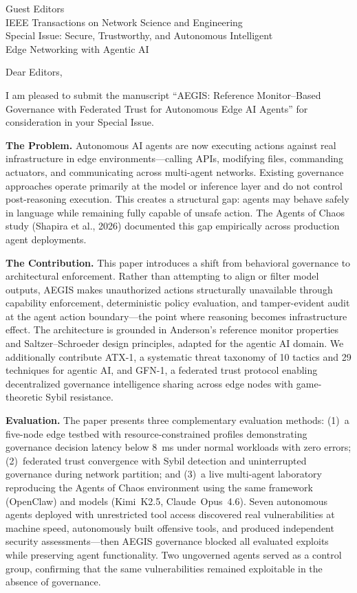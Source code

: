 \documentclass[11pt]{letter}
\begin{document}
\begin{letter}{Guest Editors\\IEEE Transactions on Network Science and Engineering\\Special Issue: Secure, Trustworthy, and Autonomous Intelligent\\Edge Networking with Agentic AI}

\opening{Dear Editors,}

I am pleased to submit the manuscript ``AEGIS: Reference Monitor--Based Governance with Federated Trust for Autonomous Edge AI Agents'' for consideration in your Special Issue.

\textbf{The Problem.} Autonomous AI agents are now executing actions against real infrastructure in edge environments---calling APIs, modifying files, commanding actuators, and communicating across multi-agent networks. Existing governance approaches operate primarily at the model or inference layer and do not control post-reasoning execution. This creates a structural gap: agents may behave safely in language while remaining fully capable of unsafe action. The Agents of Chaos study (Shapira et al., 2026) documented this gap empirically across production agent deployments.

\textbf{The Contribution.} This paper introduces a shift from behavioral governance to architectural enforcement. Rather than attempting to align or filter model outputs, AEGIS makes unauthorized actions structurally unavailable through capability enforcement, deterministic policy evaluation, and tamper-evident audit at the agent action boundary---the point where reasoning becomes infrastructure effect. The architecture is grounded in Anderson's reference monitor properties and Saltzer--Schroeder design principles, adapted for the agentic AI domain. We additionally contribute ATX-1, a systematic threat taxonomy of 10 tactics and 29 techniques for agentic AI, and GFN-1, a federated trust protocol enabling decentralized governance intelligence sharing across edge nodes with game-theoretic Sybil resistance.

\textbf{Evaluation.} The paper presents three complementary evaluation methods: (1)~a five-node edge testbed with resource-constrained profiles demonstrating governance decision latency below 8~ms under normal workloads with zero errors; (2)~federated trust convergence with Sybil detection and uninterrupted governance during network partition; and (3)~a live multi-agent laboratory reproducing the Agents of Chaos environment using the same framework (OpenClaw) and models (Kimi~K2.5, Claude~Opus~4.6). Seven autonomous agents deployed with unrestricted tool access discovered real vulnerabilities at machine speed, autonomously built offensive tools, and produced independent security assessments---then AEGIS governance blocked all evaluated exploits while preserving agent functionality. Two ungoverned agents served as a control group, confirming that the same vulnerabilities remained exploitable in the absence of governance.


\end{letter}
\end{document}
